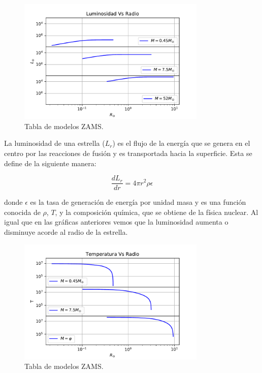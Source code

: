 \documentclass[12pt]{article}
\begin{document}
\begin{figure}[H]
    \centering   
    \includegraphics[width=0.8\textwidth]{Luminosidad_graficas.pdf}
    \caption{Tabla de modelos ZAMS.}
    \label{fig:zams}
\end{figure}


La luminosidad de una estrella ($L_r$) es el flujo de la energía que se genera en el centro por las reacciones de fusión y es transportada hacia la superficie. Esta se define de la siguiente manera:

\begin{equation}
\frac{dL_r}{dr} = 4 \pi r^2 \rho \epsilon 
\end{equation}

donde $\epsilon$ es la tasa de generación de energía por unidad masa y es una función conocida de $\rho$, $T$, y la composición química, que se obtiene de la física nuclear. Al igual que en las gráficas anteriores vemos que la luminosidad aumenta o disminuye acorde al radio de la estrella. \cite{AE}
 

\begin{figure}[H]
    \centering   
    \includegraphics[width=0.8\textwidth]{Temperatura_graficas.pdf}
    \caption{Tabla de modelos ZAMS.}
    \label{fig:zams}
\end{figure}
\end{document}
